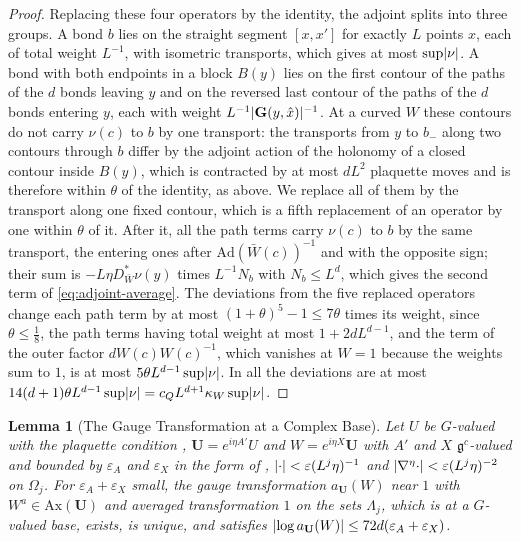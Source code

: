 \documentclass[11pt]{preprint}
\DeclarePairedDelimiter{\abs}{\lvert}{\rvert}
\numberwithin{equation}{section}
\newtheorem{lemma}{Lemma}[section]
\theoremstyle{definition}
\theoremstyle{remark}
\theoremstyle{plain}
\begin{document}
\begin{proof}
Replacing these four operators by the identity, the adjoint splits into three groups. A bond $b$ lies on the straight segment $[x, x']$ for exactly $L$ points $x$, each of total weight $L^{-1}$, with isometric transports, which gives at most $\sup\abs\nu$. A bond with both endpoints in a block $B(y)$ lies on the first contour of the paths of the $d$ bonds leaving $y$ and on the reversed last contour of the paths of the $d$ bonds entering $y$, each with weight $L^{-1}\abs{\mathbf G(y, \hat x)}^{-1}$. At a curved $W$ these contours do not carry $\nu(c)$ to $b$ by one transport: the transports from $y$ to $b_-$ along two contours through $b$ differ by the adjoint action of the holonomy of a closed contour inside $B(y)$, which is contracted by at most $dL^2$ plaquette moves and is therefore within $\theta$ of the identity, as above. We replace all of them by the transport along one fixed contour, which is a fifth replacement of an operator by one within $\theta$ of it. After it, all the path terms carry $\nu(c)$ to $b$ by the same transport, the entering ones after $\mathrm{Ad}(\bar W(c))^{-1}$ and with the opposite sign; their sum is $-L\eta D^*_{\bar W}\nu(y)$ times $L^{-1}N_b$ with $N_b \leq L^d$, which gives the second term of \eqref{eq:adjoint-average}. The deviations from the five replaced operators change each path term by at most $(1 + \theta)^5 - 1 \leq 7\theta$ times its weight, since $\theta \leq \frac18$, the path terms having total weight at most $1 + 2dL^{d-1}$, and the term of the outer factor $dW(c)W(c)^{-1}$, which vanishes at $W = 1$ because the weights sum to $1$, is at most $5\theta L^{d-1}\sup\abs\nu$. In all the deviations are at most $14(d + 1)\theta L^{d-1}\sup\abs\nu = c_QL^{d+1}\kappa_W\sup\abs\nu$.
\end{proof}

\begin{lemma}[The Gauge Transformation at a Complex Base]\label{lem:complex-base-gauge}
Let $U$ be $G$-valued with the plaquette condition \cite[(109)]{BalabanAVG}, $\mathbf U = e^{i\eta A'}U$ and $W = e^{i\eta X}\mathbf U$ with $A'$ and $X$ $\mathfrak g^c$-valued and bounded by $\varepsilon_A$ and $\varepsilon_X$ in the form of \cite[(1.69)]{BalabanREG}, $\abs\cdot < \varepsilon(L^j\eta)^{-1}$ and $\abs{\nabla^\eta\cdot} < \varepsilon(L^j\eta)^{-2}$ on $\Omega_j$. For $\varepsilon_A + \varepsilon_X$ small, the gauge transformation $a_{\mathbf U}(W)$ near $1$ with $W^{a} \in \mathrm{Ax}(\mathbf U)$ and averaged transformation $1$ on the sets $\Lambda_j$, which is \cite[(106)]{BalabanAVG} at a $G$-valued base, exists, is unique, and satisfies $\abs{\log a_{\mathbf U}(W)} \leq 72d(\varepsilon_A + \varepsilon_X)$.
\end{lemma}
\end{document}
